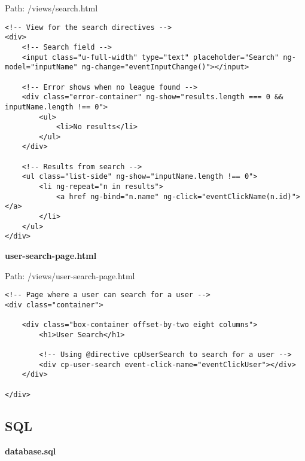 Path: /views/search.html
{\scriptsize
\begin{lstlisting}
<!-- View for the search directives -->
<div>
	<!-- Search field -->
	<input class="u-full-width" type="text" placeholder="Search" ng-model="inputName" ng-change="eventInputChange()"></input>

	<!-- Error shows when no league found -->
	<div class="error-container" ng-show="results.length === 0 && inputName.length !== 0">
		<ul>
			<li>No results</li>
		</ul>
	</div>

	<!-- Results from search -->
	<ul class="list-side" ng-show="inputName.length !== 0">
		<li ng-repeat="n in results">
			<a href ng-bind="n.name" ng-click="eventClickName(n.id)"></a>
		</li>
	</ul>
</div>\end{lstlisting}
}
\textbf{user-search-page.html}\label{user-search-page.html}

Path: /views/user-search-page.html
{\scriptsize
\begin{lstlisting}
<!-- Page where a user can search for a user -->
<div class="container">

	<div class="box-container offset-by-two eight columns">
		<h1>User Search</h1>

		<!-- Using @directive cpUserSearch to search for a user -->
		<div cp-user-search event-click-name="eventClickUser"></div>
	</div>

</div>\end{lstlisting}
}
\newpage
\subsection{SQL}
\textbf{database.sql}\label{database.sql}


